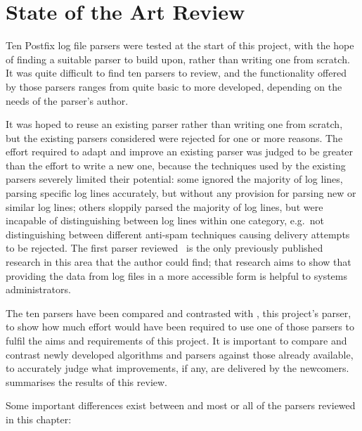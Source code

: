\chapter{State of the Art Review}

\label{state of the art review}

Ten Postfix log file parsers were tested at the start of this project, with
the hope of finding a suitable parser to build upon, rather than writing
one from scratch.  It was quite difficult to find ten parsers to review,
and the functionality offered by those parsers ranges from quite basic to
more developed, depending on the needs of the parser's author.

It was hoped to reuse an existing parser rather than writing one from
scratch, but the existing parsers considered were rejected for one or more
reasons.  The effort required to adapt and improve an existing parser was
judged to be greater than the effort to write a new one, because the
techniques used by the existing parsers severely limited their potential:
some ignored the majority of log lines, parsing specific log lines
accurately, but without any provision for parsing new or similar log lines;
others sloppily parsed the majority of log lines, but were incapable of
distinguishing between log lines within one category, e.g.\ not
distinguishing between different anti-spam techniques causing delivery
attempts to be rejected.  The first parser
reviewed~\cite{log-mail-analyser} is the only previously published research
in this area that the author could find; that research aims to show that
providing the data from log files in a more accessible form is helpful to
systems administrators.

The ten parsers have been compared and contrasted with \parsername{}, this
project's parser, to show how much effort would have been required to use
one of those parsers to fulfil the aims and requirements of this project.
It is important to compare and contrast newly developed algorithms and
parsers against those already available, to accurately judge what
improvements, if any, are delivered by the newcomers.   summarises the results of this review.

Some important differences exist between \parsername{} and most or all of
the parsers reviewed in this chapter:

